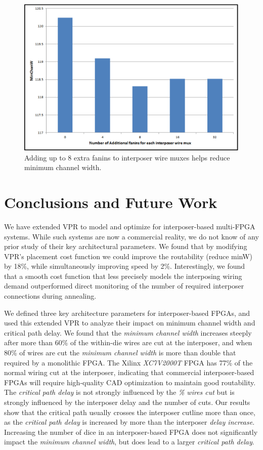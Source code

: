 \documentclass{sig-alternate-2013}
\begin{document}
\begin{figure}[!h]
\centering
\includegraphics[width=\linewidth]{additional_fanins.eps}
\caption{Adding up to 8 extra fanins to interposer wire muxes helps reduce minimum channel width.}
\label{fig:additional_fanins}
\end{figure}


\section{Conclusions and Future Work}
\label{conclusionSection}
We have extended VPR to model and optimize for interposer-based multi-FPGA systems. While such systems are now a commercial reality, we do not know of any prior study of their key architectural parameters. We found that by modifying VPR's placement cost function we could improve the routability (reduce minW) by 18\%, while simultaneously improving speed by 2\%. Interestingly, we found that a smooth cost function that less precisely models the interposing wiring demand outperformed direct monitoring of the number of required interposer connections during annealing.

We defined three key architecture parameters for interposer-based FPGAs, and used this extended VPR to analyze their impact on minimum channel width and critical path delay. We found that the \textit{minimum channel width} increases steeply after more than 60\% of the within-die wires are cut at the interposer, and when 80\% of wires are cut the \textit{minimum channel width} is more than double that required by a monolithic FPGA. The Xilinx \textit{XC7V2000T} FPGA has 77\% of the normal wiring cut at the interposer, indicating that commercial interposer-based FPGAs will require high-quality CAD optimization to maintain good routability. The \textit{critical path delay} is not strongly influenced by the \textit{\% wires cut} but is strongly influenced by the interposer delay and the number of cuts. Our results show that the critical path usually crosses the interposer cutline more than once, as the \textit{critical path delay} is increased by more than the interposer \textit{delay increase}. Increasing the number of dice in an interposer-based FPGA does not significantly impact the \textit{minimum channel width}, but does lead to a larger \textit{critical path delay}.
\end{document}
